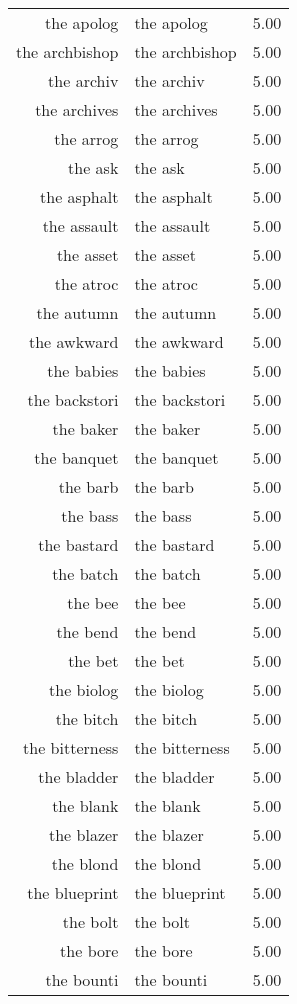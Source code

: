 \begin{table}[ht]
\begin{tabular}{rlr}
  the apolog & the apolog & 5.00 \\ 
  the archbishop & the archbishop & 5.00 \\ 
  the archiv & the archiv & 5.00 \\ 
  the archives & the archives & 5.00 \\ 
  the arrog & the arrog & 5.00 \\ 
  the ask & the ask & 5.00 \\ 
  the asphalt & the asphalt & 5.00 \\ 
  the assault & the assault & 5.00 \\ 
  the asset & the asset & 5.00 \\ 
  the atroc & the atroc & 5.00 \\ 
  the autumn & the autumn & 5.00 \\ 
  the awkward & the awkward & 5.00 \\ 
  the babies & the babies & 5.00 \\ 
  the backstori & the backstori & 5.00 \\ 
  the baker & the baker & 5.00 \\ 
  the banquet & the banquet & 5.00 \\ 
  the barb & the barb & 5.00 \\ 
  the bass & the bass & 5.00 \\ 
  the bastard & the bastard & 5.00 \\ 
  the batch & the batch & 5.00 \\ 
  the bee & the bee & 5.00 \\ 
  the bend & the bend & 5.00 \\ 
  the bet & the bet & 5.00 \\ 
  the biolog & the biolog & 5.00 \\ 
  the bitch & the bitch & 5.00 \\ 
  the bitterness & the bitterness & 5.00 \\ 
  the bladder & the bladder & 5.00 \\ 
  the blank & the blank & 5.00 \\ 
  the blazer & the blazer & 5.00 \\ 
  the blond & the blond & 5.00 \\ 
  the blueprint & the blueprint & 5.00 \\ 
  the bolt & the bolt & 5.00 \\ 
  the bore & the bore & 5.00 \\ 
  the bounti & the bounti & 5.00 \\ 

\end{tabular}
\end{table}
